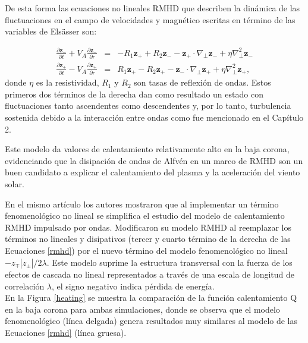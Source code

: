 \documentclass[a4paper,11pt]{report}
\begin{document}
De esta forma las ecuaciones no lineales RMHD que describen la dinámica de las fluctuaciones en el campo de velocidades y magnético escritas en término de las variables de Elsässer son:


\begin{eqnarray}
  \frac{\partial \boldsymbol{z}_-}{\partial t} + V_A \frac{\partial \boldsymbol{z}_-}{\partial r} &=& -R_1\boldsymbol{z}_+ +R_2 \boldsymbol{z}_- -\boldsymbol{z}_+ \cdot \nabla_\perp \boldsymbol{z}_- + \eta \nabla ^2_\perp\boldsymbol{z}_- \nonumber
  \\
  \frac{\partial \boldsymbol{z}_+}{\partial t} - V_A \frac{\partial \boldsymbol{z}_+}{\partial r} &=& R_1\boldsymbol{z}_+ - R_2 \boldsymbol{z}_+ -\boldsymbol{z}_- \cdot \nabla_\perp \boldsymbol{z}_+ + \eta \nabla ^2_\perp\boldsymbol{z}_+, \label{rmhd}
\end{eqnarray}
donde $\eta$ es la resistividad, $R_1$ y $R_2$ son tasas de reflexión de ondas. Estos primeros dos términos de la derecha dan como resultado un estado con fluctuaciones tanto ascendentes como descendentes y, por lo tanto, turbulencia sostenida debido a la interacción entre ondas como fue mencionado en el Capítulo 2.

Este modelo da valores de calentamiento relativamente alto en la baja corona, evidenciando que la disipación de ondas de Alfvén en un marco de RMHD son un buen candidato a explicar el calentamiento del plasma y la aceleración del viento solar.

En el mismo artículo los autores mostraron que al implementar un término fenomenológico no lineal se simplifica el estudio del modelo de calentamiento RMHD impulsado por ondas. Modificaron su modelo RMHD al reemplazar los términos no lineales y disipativos (tercer y cuarto término de la derecha de las Ecuaciones \ref{rmhd}) por el nuevo término del modelo fenomenológico no lineal $-z_\mp|z_\pm|/2\lambda$. Este modelo suprime la estructura transversal con la fuerza de los efectos de cascada no lineal representados a través de una escala de longitud de correlación $\lambda$, el signo negativo indica pérdida de energía.
\\
En la Figura \ref{heating} se muestra la comparación de la función calentamiento Q en la baja corona para ambas simulaciones, donde se observa que el modelo fenomenológico (línea delgada) genera resultados muy similares al modelo de las Ecuaciones \ref{rmhd} (línea gruesa).

\end{document}

